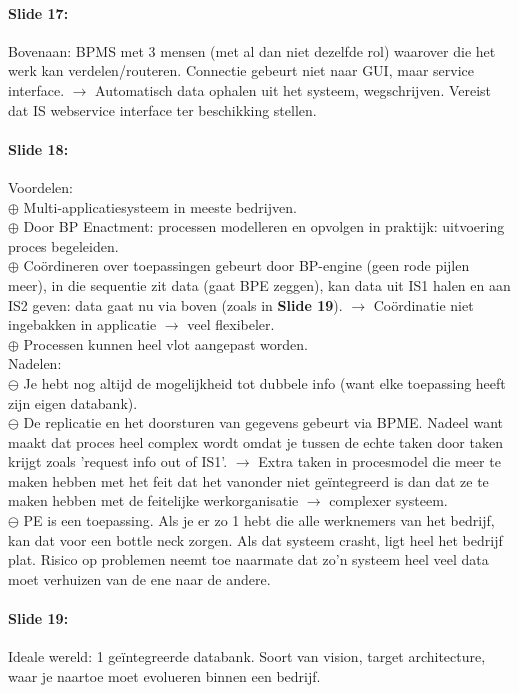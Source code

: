 \documentclass[10pt,a4paper]{report}
\begin{document}
\paragraph{Slide 17:}Bovenaan: BPMS met 3 mensen (met al dan niet dezelfde rol) waarover die het werk kan verdelen/routeren. Connectie gebeurt niet naar GUI, maar service interface. $\rightarrow$ Automatisch data ophalen uit het systeem, wegschrijven. Vereist dat IS webservice interface ter beschikking stellen. 

\paragraph{Slide 18:}Voordelen:\\
$\oplus$ Multi-applicatiesysteem in meeste bedrijven.\\
$\oplus$ Door BP Enactment: processen modelleren en opvolgen in praktijk: uitvoering proces begeleiden.\\
$\oplus$ Coördineren over toepassingen gebeurt door BP-engine (geen rode pijlen meer), in die sequentie zit data (gaat BPE zeggen), kan data uit IS1 halen en aan IS2 geven: data gaat nu via boven (zoals in \textbf{Slide 19}). $\rightarrow$ Coördinatie niet ingebakken in applicatie $\rightarrow$ veel flexibeler. \\
$\oplus$ Processen kunnen heel vlot aangepast worden.\\
Nadelen:\\
$\ominus$ Je hebt nog altijd de mogelijkheid tot dubbele info (want elke toepassing heeft zijn eigen databank).\\
$\ominus$ De replicatie en het doorsturen van gegevens gebeurt via BPME. Nadeel want maakt dat proces heel complex wordt omdat je tussen de echte taken door taken krijgt zoals 'request info out of IS1'. $\rightarrow$ Extra taken in procesmodel die meer te maken hebben met het feit dat het vanonder niet geïntegreerd is dan dat ze te maken hebben met de feitelijke werkorganisatie $\rightarrow$ complexer systeem.\\
$\ominus$ PE is een toepassing. Als je er zo 1 hebt die alle werknemers van het bedrijf, kan dat voor een bottle neck zorgen. Als dat systeem crasht, ligt heel het bedrijf plat. Risico op problemen neemt toe naarmate dat zo'n systeem heel veel data moet verhuizen van de ene naar de andere.
	
\paragraph{Slide 19:}Ideale wereld: 1 geïntegreerde databank. Soort van vision, target architecture, waar je naartoe moet evolueren binnen een bedrijf.
\end{document}
